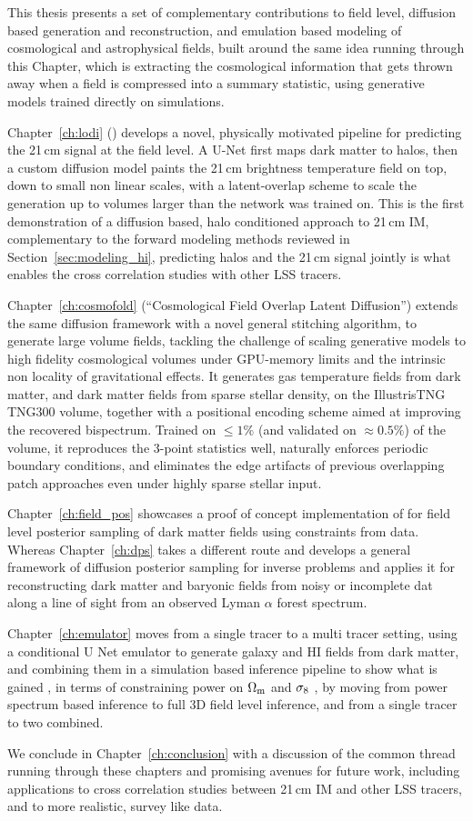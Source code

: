 This thesis presents a set of complementary contributions to field level, diffusion based generation and reconstruction, and emulation based modeling of cosmological and astrophysical fields, built around the same idea running through this Chapter, which is extracting the cosmological information that gets thrown away when a field is compressed into a summary statistic, using generative models trained directly on simulations.

Chapter~\ref{ch:lodi} (\LODI) develops a novel, physically motivated pipeline for predicting the 21\,cm signal at the field level. A U-Net first maps dark matter to halos, then a custom diffusion model paints the 21\,cm brightness temperature field on top, down to small non linear scales, with a latent-overlap scheme to scale the generation up to volumes larger than the network was trained on. This is the first demonstration of a diffusion based, halo conditioned approach to 21\,cm IM, complementary to the forward modeling methods reviewed in Section~\ref{sec:modeling_hi}, predicting halos and the 21\,cm signal jointly is what enables the cross correlation studies with other LSS tracers.


Chapter~\ref{ch:cosmofold} (\FOLD  ``Cosmological Field Overlap Latent Diffusion'') extends the same diffusion framework with a novel general stitching algorithm, to generate large volume fields, tackling the challenge of scaling generative models to high fidelity cosmological volumes under GPU-memory limits and the intrinsic non locality of gravitational effects. It generates gas temperature fields from dark matter, and dark matter fields from sparse stellar density, on the IllustrisTNG TNG300 volume, together with a positional encoding scheme aimed at improving the recovered bispectrum. Trained on $\leq 1\%$ (and validated on $\approx 0.5\%$) of the volume, it reproduces the 3-point statistics well, naturally enforces periodic boundary conditions, and eliminates the edge artifacts of previous overlapping patch approaches even under highly sparse stellar input.


Chapter~\ref{ch:field_pos} showcases a proof of concept implementation of \FOLD for field level posterior sampling of dark matter fields using constraints from data. Whereas Chapter~\ref{ch:dps} takes a different route and develops a general framework of diffusion posterior sampling for inverse problems and applies it for reconstructing dark matter and baryonic fields from noisy or incomplete dat along a line of sight from an observed Lyman $\alpha$ forest spectrum.

Chapter~\ref{ch:emulator} moves from a single tracer to a multi tracer setting, using a conditional U Net emulator to generate galaxy and HI fields from dark matter, and combining them in a simulation based inference pipeline to show what is gained , in terms of constraining power on $\Omega_\mathrm{m}$ and $\sigma_8$ , by moving from power spectrum based inference to full 3D field level inference, and from a single tracer to two combined.

We conclude in Chapter~\ref{ch:conclusion} with a discussion of the common thread running through these chapters and promising avenues for future work, including applications to cross correlation studies between 21\,cm IM and other LSS tracers, and to more realistic, survey like data.
